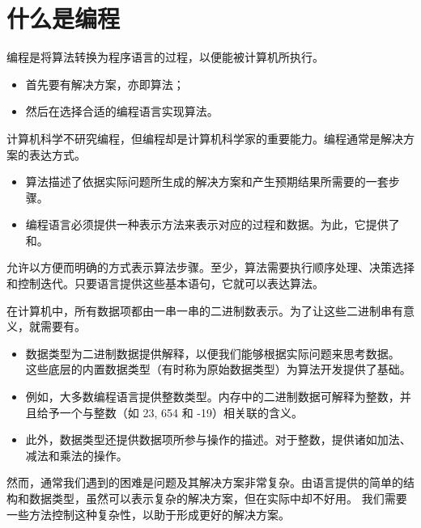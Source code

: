 \section{什么是编程}

\begin{frame}\ft{\secname}
  编程是将算法转换为程序语言的过程，以便能被计算机所执行。

  \begin{itemize}
  \item 首先要有解决方案，亦即算法；
  \item 然后在选择合适的编程语言实现算法。
  \end{itemize}
  计算机科学不研究编程，但编程却是计算机科学家的重要能力。编程通常是解决方案的表达方式。
\end{frame}

\begin{frame}\ft{\secname}
  \begin{itemize}
  \item 算法描述了依据实际问题所生成的解决方案和产生预期结果所需要的一套步骤。

  \item 编程语言必须提供一种表示方法来表示对应的过程和数据。为此，它提供了和。
  \end{itemize}
\end{frame}

\begin{frame}\ft{\secname}
允许以方便而明确的方式表示算法步骤。至少，算法需要执行顺序处理、决策选择和控制迭代。只要语言提供这些基本语句，它就可以表达算法。
\end{frame}

\begin{frame}\ft{\secname}
  在计算机中，所有数据项都由一串一串的二进制数表示。为了让这些二进制串有意义，就需要有。 
  \begin{itemize}
  \item 数据类型为二进制数据提供解释，以便我们能够根据实际问题来思考数据。
    这些底层的内置数据类型（有时称为原始数据类型）为算法开发提供了基础。 \pause 
  \item[] 
    例如，大多数编程语言提供整数类型。内存中的二进制数据可解释为整数，并且给予一个与整数（如 23, 654 和 -19）相关联的含义。 \pause \\[0.1in]
  \item   此外，数据类型还提供数据项所参与操作的描述。对于整数，提供诸如加法、减法和乘法的操作。%
  \end{itemize}

  
\end{frame}

\begin{frame}\ft{\secname}
  然而，通常我们遇到的困难是问题及其解决方案非常复杂。由语言提供的简单的结构和数据类型，虽然可以表示复杂的解决方案，但在实际中却不好用。
  我们需要一些方法控制这种复杂性，以助于形成更好的解决方案。
\end{frame}